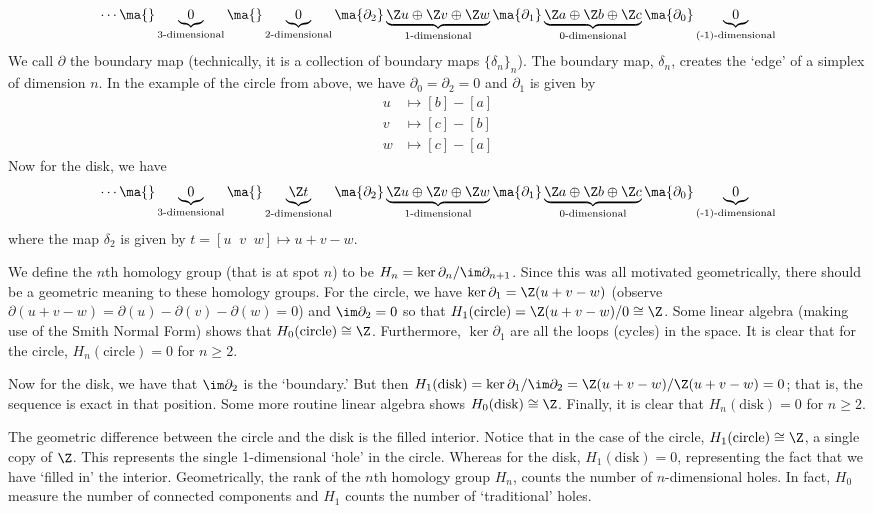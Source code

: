 	\[
	\cdots \ma{} \underbrace{0}_{\text{3-dimensional}} \ma{} \underbrace{0}_{\text{2-dimensional}} \ma{\partial_2} \underbrace{\Z u \oplus \Z v \oplus \Z w}_{\text{1-dimensional}} \ma{\partial_1} \underbrace{\Z a \oplus \Z b \oplus \Z c}_{\text{0-dimensional}} \ma{\partial_0} \underbrace{0}_{\text{(-1)-dimensional}}
	\]
We call $\partial$ the boundary map (technically, it is a collection of boundary maps $\{\delta_n\}_n$). The boundary map, $\delta_n$, creates the `edge' of a simplex of dimension $n$. In the example of the circle from above, we have $\partial_0=\partial_2=0$ and $\partial_1$ is given by
	\[
	\begin{split}
	u &\mapsto [b]-[a] \\
	v &\mapsto [c]-[b] \\
	w &\mapsto [c]-[a]
	\end{split}
	\]
Now for the disk, we have
	\[
	\cdots \ma{} \underbrace{0}_{\text{3-dimensional}} \ma{} \underbrace{\Z t}_{\text{2-dimensional}} \ma{\partial_2} \underbrace{\Z u \oplus \Z v \oplus \Z w}_{\text{1-dimensional}} \ma{\partial_1} \underbrace{\Z a \oplus \Z b \oplus \Z c}_{\text{0-dimensional}} \ma{\partial_0} \underbrace{0}_{\text{(-1)-dimensional}}
	\]
where the map $\delta_2$ is given by $t= [u\;\;v\;\;w] \mapsto u+v-w$. 


We define the $n$th homology group (that is at spot $n$) to be $H_n= \ker \partial_n/ \im \partial_{n+1}$. Since this was all motivated geometrically, there should be a geometric meaning to these homology groups. For the circle, we have $\ker \partial_1=\Z(u+v-w)$ (observe $\partial(u+v-w)=\partial(u)-\partial(v)-\partial(w)=0$) and $\im \partial_2=0$ so that $H_1(\text{circle})=\Z(u+v-w)/0 \cong \Z$. Some linear algebra (making use of the Smith Normal Form) shows that $H_0(\text{circle}) \cong \Z$. Furthermore, $\ker \partial_1$ are all the loops (cycles) in the space. It is clear that for the circle, $H_n(\text{circle})=0$ for $n \geq 2$. 


Now for the disk, we have that $\im \partial_2$ is the `boundary.' But then $H_1(\text{disk})=\ker \partial_1/\im \partial_2=\Z(u+v-w)/\Z(u+v-w)=0$; that is, the sequence is exact in that position. Some more routine linear algebra shows $H_0(\text{disk}) \cong \Z$. Finally, it is clear that $H_n(\text{disk})=0$ for $n \geq 2$. 


The geometric difference between the circle and the disk is the filled interior. Notice that in the case of the circle, $H_1(\text{circle}) \cong \Z$, a single copy of $\Z$. This represents the single 1-dimensional `hole' in the circle. Whereas for the disk, $H_1(\text{disk})=0$, representing the fact that we have `filled in' the interior. Geometrically, the rank of the $n$th homology group $H_n$, counts the number of $n$-dimensional holes. In fact, $H_0$ measure the number of connected components and $H_1$ counts the number of `traditional' holes. 


